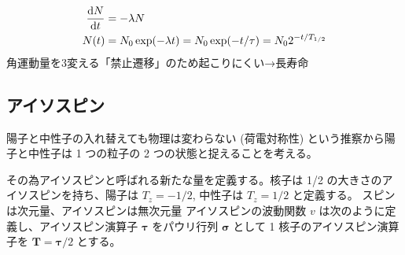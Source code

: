\documentclass[uplatex,dvipdfmx,a4paper,11pt]{jlreq}
\numberwithin{equation}{section}
\theoremstyle{definition}
\begin{document}
\begin{align}
  \diff{N}{t} & = -\lambda N                                                 \\
  N(t)        & = N_0\exp(-\lambda t) = N_0\exp(-t/\tau) = N_02^{-t/T_{1/2}}
\end{align}
角運動量を3変える「禁止遷移」のため起こりにくい→長寿命


\subsection{アイソスピン}
陽⼦と中性⼦の⼊れ替えても物理は変わらない (荷電対称性) という推察から陽子と中性子は 1 つの粒子の 2 つの状態と捉えることを考える。

その為アイソスピンと呼ばれる新たな量を定義する。核子は 1/2 の大きさのアイソスピンを持ち、陽子は $T_z = -1/2$, 中性子は $T_z = 1/2$ と定義する。
スピンは次元量、アイソスピンは無次元量
アイソスピンの波動関数 $v$ は次のように定義し、アイソスピン演算子 $\bm{\tau}$ をパウリ行列 $\bm{\sigma}$ として 1 核子のアイソスピン演算子を $\bm{T} = \bm{\tau}/2$ とする。
\end{document}
